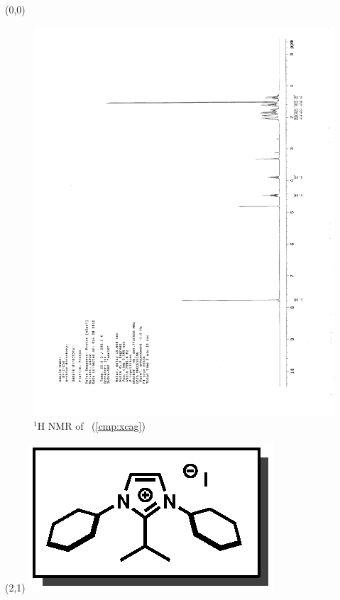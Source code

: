 \begin{textblock}{20}(0,0)
\begin{figure}[htb]
\caption{$^1$H NMR of \CMPxcag\ (\ref{cmp:xcag})}
\includegraphics[scale=0.75, trim = 0mm 0mm 0mm 5mm,
clip]{chp_alkylation/images/nmr/xcagH}
\vspace{-100pt}
\end{figure}
\end{textblock}
\begin{textblock}{1}(2,1)
\includegraphics[scale=0.8, angle=90]{chp_alkylation/images/xcag}
\end{textblock}
